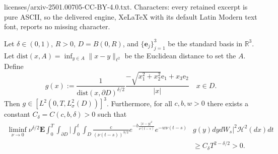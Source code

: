 \documentclass[10pt,a4paper]{amsart}
\def\E{\mathbf{E}}
\def\H{{\mathcal H}}
\def\R{{\mathbb R}} %
\def\dist{\mathrm{dist}}
\def\ds{\displaystyle}
\begin{document}
licenses/arxiv-2501.00705-CC-BY-4.0.txt. Characters: every retained excerpt is pure ASCII, so the delivered engine, XeLaTeX with its default Latin Modern text font, reports no missing character.
\begin{proposition}\label{proposition: choice of forcing}
    Let $\delta \in (0,1)$, $R > 0$, $D = B(0,R)$, and $\{\mathbf{e}_j\}_{j=1}^3$ be the standard basis in $\R^3$. Let $\dist(x, A) = \ds\inf_{y \in A}\|x-y\|_{\ell^2}$ be the Euclidean distance to set the $A$. 
    Define
    \[
        g(x) := \frac{1}{\dist(x, \partial D)^{\delta/2}}\frac{-\sqrt{x_1^2 + x_2^2}\mathrm{e}_1 + x_3\mathrm{e}_2}{|x|} \quad x \in D.
    \]
    Then $g \in [L^2(0,T, L_\sigma^2(D))]^3$.
    Furthermore, for all $c,b,w > 0$ there exists a constant $C_\delta = C(c,b,\delta) >  0$ such that
    \begin{align*}
        \liminf_{\nu \to 0}\nu^{\delta/2}\E\int_0^T\int_{\partial D}\Big|\int_0^t\int_D \frac{c}{(\nu (t-s))^{3/2}}e^{-b\frac{|x-y|^2}{\nu (t-s)}}e^{-w\nu (t-s)}&g(y)dydW_s\Big|^2\H^2(dx)dt\\
        &\geq C_\delta T^{2-\delta/2} > 0.
    \end{align*}
\end{proposition}
\end{document}
